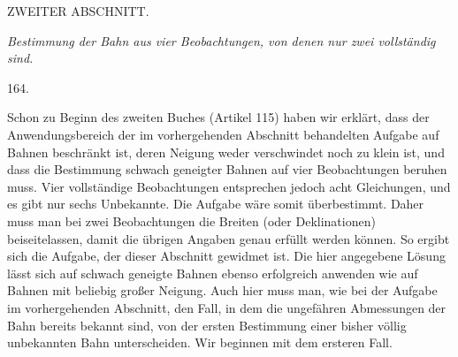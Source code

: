 \clearpage
{}
\begin{center}
{\large ZWEITER ABSCHNITT.}\par\medskip
\emph{Bestimmung der Bahn aus vier Beobachtungen, von denen nur zwei vollständig sind.}\par\bigskip
\hypertarget{native-228-article164}{}164.
\end{center}
Schon zu Beginn des zweiten Buches (Artikel 115) haben wir erklärt, dass der Anwendungsbereich der im vorhergehenden Abschnitt behandelten Aufgabe auf Bahnen beschränkt ist, deren Neigung weder verschwindet noch zu klein ist, und dass die Bestimmung schwach geneigter Bahnen auf vier Beobachtungen beruhen muss. Vier vollständige Beobachtungen entsprechen jedoch acht Gleichungen, und es gibt nur sechs Unbekannte. Die Aufgabe wäre somit überbestimmt. Daher muss man bei zwei Beobachtungen die Breiten (oder Deklinationen) beiseitelassen, damit die übrigen Angaben genau erfüllt werden können. So ergibt sich die Aufgabe, der dieser Abschnitt gewidmet ist. Die hier angegebene Lösung lässt sich auf schwach geneigte Bahnen ebenso erfolgreich anwenden wie auf Bahnen mit beliebig großer Neigung. Auch hier muss man, wie bei der Aufgabe im vorhergehenden Abschnitt, den Fall, in dem die ungefähren Abmessungen der Bahn bereits bekannt sind, von der ersten Bestimmung einer bisher völlig unbekannten Bahn unterscheiden. Wir beginnen mit dem ersteren Fall.
